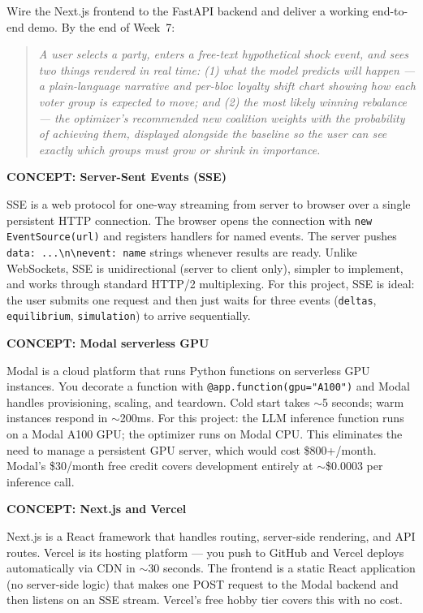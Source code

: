 \documentclass[11pt]{article}
\newcommand{\concept}[2]{%
  \begin{mdframed}[style=conceptbox]
  {\small\bfseries\color{bluefg}CONCEPT: #1}\par\smallskip #2
  \end{mdframed}}
\begin{document}
Wire the Next.js frontend to the FastAPI backend and deliver a working end-to-end demo.
By the end of Week~7:

\begin{quote}
\textit{A user selects a party, enters a free-text hypothetical shock event, and sees two
things rendered in real time: (1) what the model predicts will happen --- a plain-language
narrative and per-bloc loyalty shift chart showing how each voter group is expected to
move; and (2) the most likely winning rebalance --- the optimizer's recommended new
coalition weights with the probability of achieving them, displayed alongside the
baseline so the user can see exactly which groups must grow or shrink in importance.}
\end{quote}

\concept{Server-Sent Events (SSE)}{
SSE is a web protocol for one-way streaming from server to browser over a single
persistent HTTP connection. The browser opens the connection with
\texttt{new EventSource(url)} and registers handlers for named events. The server
pushes \texttt{data: ...\textbackslash n\textbackslash nevent: name} strings whenever
results are ready. Unlike WebSockets, SSE is unidirectional (server to client only),
simpler to implement, and works through standard HTTP/2 multiplexing. For this project,
SSE is ideal: the user submits one request and then just waits for three events
(\texttt{deltas}, \texttt{equilibrium}, \texttt{simulation}) to arrive sequentially.
}

\concept{Modal serverless GPU}{
Modal is a cloud platform that runs Python functions on serverless GPU instances.
You decorate a function with \texttt{@app.function(gpu="A100")} and Modal handles
provisioning, scaling, and teardown. Cold start takes $\sim$5 seconds; warm
instances respond in $\sim$200ms. For this project: the LLM inference function
runs on a Modal A100 GPU; the optimizer runs on Modal CPU. This eliminates the
need to manage a persistent GPU server, which would cost \$800+/month. Modal's
\$30/month free credit covers development entirely at $\sim$\$0.0003 per inference call.
}

\concept{Next.js and Vercel}{
Next.js is a React framework that handles routing, server-side rendering, and API
routes. Vercel is its hosting platform --- you push to GitHub and Vercel deploys
automatically via CDN in $\sim$30 seconds. The frontend is a static React application
(no server-side logic) that makes one POST request to the Modal backend and then
listens on an SSE stream. Vercel's free hobby tier covers this with no cost.
}
\end{document}
